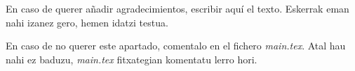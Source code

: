 \thispagestyle{empty}

En caso de querer añadir agradecimientos, escribir aquí el texto. Eskerrak eman nahi izanez gero, hemen idatzi testua. 

En caso de no querer este apartado, comentalo en el fichero \textit{main.tex}. Atal hau nahi ez baduzu, \textit{main.tex} fitxategian komentatu lerro hori. 

